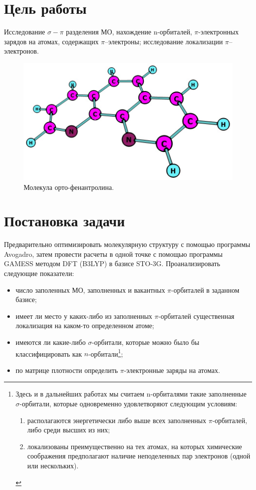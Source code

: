 \section{Цель работы}
Исследование $\sigma-\pi$ разделения МО, нахождение n-орбиталей, $\pi$-электронных зарядов на атомах, содержащих $\pi$–электроны; исследование локализации $\pi$–электронов.

\begin{figure}[H]
\centering
\captionsetup{justification=centering}
\includegraphics[scale=0.5]{fig/0.jpg}
\caption{Молекула орто-фенантролина.}
\end{figure}

\newpage
\section{Постановка задачи}
Предварительно оптимизировать молекулярную структуру с помощью программы Avogadro, затем провести расчеты в одной точке с помощью программы GAMESS методом DFT (B3LYP) в базисе STO-3G. Проанализировать следующие показатели: 
\begin{itemize}
    \item число заполенных МО, заполненных и вакантных $\pi$-орбиталей в заданном базисе;
    \item имеет ли место у каких-либо из заполненных $\pi$-орбиталей существенная локализация на каком-то определенном атоме;
    \item имеются ли какие-либо $\sigma$-орбитали, которые можно было бы классифицировать как $n$-орбитали\footnote{Здесь и в дальнейших работах мы считаем n-орбиталями такие заполненные $\sigma$-орбитали, которые одновременно удовлетворяют следующим условиям:
\begin{enumerate}
    \item располагаются энергетически либо  выше всех заполненных $\pi$-орбиталей, либо среди высших из них; 
    \item локализованы преимущественно на тех атомах, на которых химические соображения предполагают наличие неподеленных пар электронов (одной или нескольких).
\end{enumerate}{}};
    \item по матрице плотности определить $\pi$-электронные заряды на атомах.
\end{itemize}

